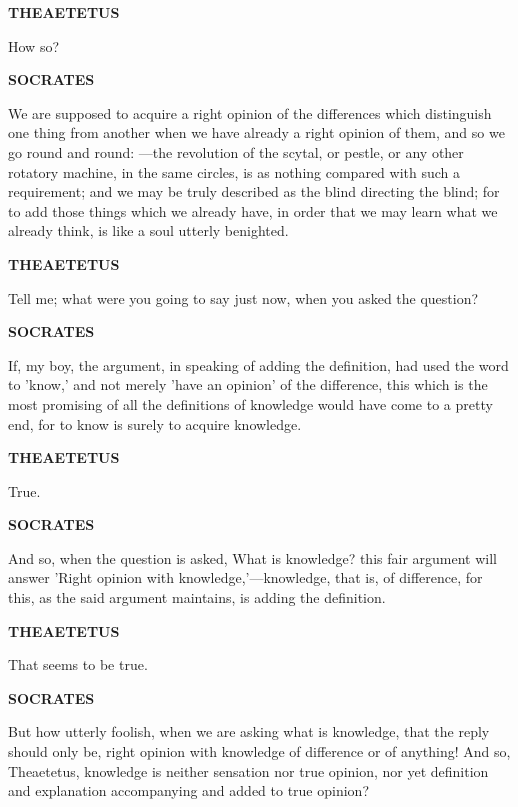 \documentclass[11pt,letter]{article}
\begin{document}
\par \textbf{THEAETETUS}
\par   How so?

\par \textbf{SOCRATES}
\par   We are supposed to acquire a right opinion of the differences which distinguish one thing from another when we have already a right opinion of them, and so we go round and round: —the revolution of the scytal, or pestle, or any other rotatory machine, in the same circles, is as nothing compared with such a requirement; and we may be truly described as the blind directing the blind; for to add those things which we already have, in order that we may learn what we already think, is like a soul utterly benighted.

\par \textbf{THEAETETUS}
\par   Tell me; what were you going to say just now, when you asked the question?

\par \textbf{SOCRATES}
\par   If, my boy, the argument, in speaking of adding the definition, had used the word to 'know,' and not merely 'have an opinion' of the difference, this which is the most promising of all the definitions of knowledge would have come to a pretty end, for to know is surely to acquire knowledge.

\par \textbf{THEAETETUS}
\par   True.

\par \textbf{SOCRATES}
\par   And so, when the question is asked, What is knowledge? this fair argument will answer 'Right opinion with knowledge,'—knowledge, that is, of difference, for this, as the said argument maintains, is adding the definition.

\par \textbf{THEAETETUS}
\par   That seems to be true.

\par \textbf{SOCRATES}
\par   But how utterly foolish, when we are asking what is knowledge, that the reply should only be, right opinion with knowledge of difference or of anything! And so, Theaetetus, knowledge is neither sensation nor true opinion, nor yet definition and explanation accompanying and added to true opinion?
\end{document}
